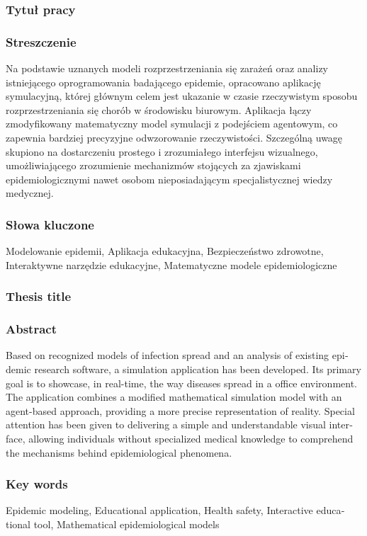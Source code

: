 \subsubsection*{Tytuł pracy} 
\Title

\subsubsection*{Streszczenie}  
Na podstawie uznanych modeli rozprzestrzeniania się zarażeń oraz analizy istniejącego oprogramowania badającego epidemie, opracowano aplikację symulacyjną, której głównym celem jest ukazanie w czasie rzeczywistym sposobu rozprzestrzeniania się chorób w środowisku biurowym. Aplikacja łączy zmodyfikowany matematyczny model symulacji z podejściem agentowym, co zapewnia bardziej precyzyjne odwzorowanie rzeczywistości. Szczególną uwagę skupiono na dostarczeniu prostego i zrozumiałego interfejsu wizualnego, umożliwiającego zrozumienie mechanizmów stojących za zjawiskami epidemiologicznymi nawet osobom nieposiadającym specjalistycznej wiedzy medycznej.

\subsubsection*{Słowa kluczone}
Modelowanie epidemii,
Aplikacja edukacyjna,
Bezpieczeństwo zdrowotne,
Interaktywne narzędzie edukacyjne,
Matematyczne modele epidemiologiczne

\subsubsection*{Thesis title} 
\begin{otherlanguage}{british}
\TitleAlt
\end{otherlanguage}

\subsubsection*{Abstract} 
\begin{otherlanguage}{british}
Based on recognized models of infection spread and an analysis of existing epidemic research software, a simulation application has been developed. Its primary goal is to showcase, in real-time, the way diseases spread in a office environment. The application combines a modified mathematical simulation model with an agent-based approach, providing a more precise representation of reality. Special attention has been given to delivering a simple and understandable visual interface, allowing individuals without specialized medical knowledge to comprehend the mechanisms behind epidemiological phenomena.
\end{otherlanguage}
\subsubsection*{Key words}  
\begin{otherlanguage}{british}
	Epidemic modeling,
	Educational application,
	Health safety,
	Interactive educational tool,
	Mathematical epidemiological models
\end{otherlanguage}

